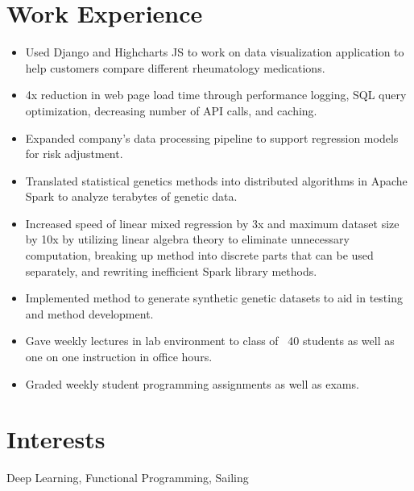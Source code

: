 \documentclass[12pt]{john_resume}
\begin{document}
\section{Work Experience}
\begin{itemize}
	\itemsep0em 
	\item Used Django and Highcharts JS to work on data visualization application to help customers compare different rheumatology medications.
	\item 4x reduction in web page load time through performance logging, SQL query optimization, decreasing number of API calls, and caching.
	\item Expanded company's data processing pipeline to support regression models for risk adjustment.
\end{itemize}
\begin{itemize}
	\itemsep0em 
	\item Translated statistical genetics methods into distributed algorithms in Apache Spark to analyze 
		terabytes of genetic data.
	\item Increased speed of linear mixed regression by 3x and maximum dataset size by 10x by utilizing 
		linear algebra theory to eliminate unnecessary computation, breaking up method into discrete parts 	
		that can be used separately, and rewriting inefficient Spark library methods. 
	\item Implemented method to generate synthetic genetic datasets to aid in testing and method 
		development.
\end{itemize}
\begin{itemize}
	\itemsep0em 
	\item Gave weekly lectures in lab environment to class of ~40 students as well as one on one instruction in office hours. 
	\item Graded weekly student programming assignments as well as exams.
\end{itemize}


\section{Interests}
Deep Learning, Functional Programming, Sailing
\end{document}

